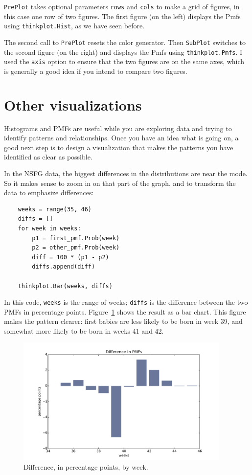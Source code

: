 \documentclass[12pt]{book}
\begin{document}
{\tt PrePlot} takes optional parameters {\tt rows} and {\tt cols}
to make a grid of figures, in this case one row of two figures.
The first figure (on the left) displays the Pmfs using {\tt thinkplot.Hist},
as we have seen before.

The second call to {\tt PrePlot} resets the color generator.  Then
{\tt SubPlot} switches to the second figure (on the right) and
displays the Pmfs using {\tt thinkplot.Pmfs}.  I used the {\tt axis} option
to ensure that the two figures are on the same axes, which is
generally a good idea if you intend to compare two figures.


\section{Other visualizations}
\label{visualization}

Histograms and PMFs are useful while you are exploring data and
trying to identify patterns and relationships.
Once you have an idea what is going on, a good next step is to
design a visualization that makes the patterns you have identified
as clear as possible.

In the NSFG data, the biggest differences in the distributions are
near the mode.  So it makes sense to zoom in on that part of the
graph, and to transform the data to emphasize differences:

\begin{verbatim}
    weeks = range(35, 46)
    diffs = []
    for week in weeks:
        p1 = first_pmf.Prob(week)
        p2 = other_pmf.Prob(week)
        diff = 100 * (p1 - p2)
        diffs.append(diff)

    thinkplot.Bar(weeks, diffs)
\end{verbatim}

In this code, {\tt weeks} is the range of weeks; {\tt diffs} is the
difference between the two PMFs in percentage points.
Figure~\ref{probability_nsfg_diffs} shows the result as a bar chart.
This figure makes the pattern clearer: first babies are less likely to
be born in week 39, and somewhat more likely to be born in weeks 41
and 42.

\begin{figure}
\centerline{\includegraphics[height=2.5in]{figs/probability_nsfg_diffs.pdf}}
\caption{Difference, in percentage points, by week.}
\label{probability_nsfg_diffs}
\end{figure}
\end{document}
